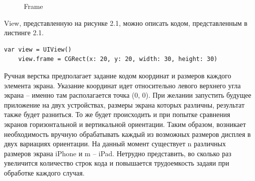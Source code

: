\begin{figure}[h!]
	\caption{Frame}
	\label{fig:frame}
\end{figure}

View, представленную на рисунке 2.1, можно описать кодом, представленным в листинге 2.1. 

\begin{lstlisting}[caption=Задание свойства frame для UIView]
	var view = UIView()
	view.frame = CGRect(x: 20, y: 20, width: 30, height: 30)
\end{lstlisting}

Ручная верстка предполагает задание кодом координат и размеров каждого элемента экрана. Указание координат идет относительно левого верхнего угла экрана -- именно там располагается точка (0, 0). При желании запустить будущее приложение на двух устройствах, размеры экрана которых различны, результат также будет разниться. То же будет происходить и при попытке сравнения экранов горизонтальной и вертикальной ориентации. Таким образом, возникает необходимость вручную обрабатывать каждый из возможных размеров дисплея в двух вариациях ориентации. На данный момент существует n различных размеров экрана iPhone и m -- iPad. Нетрудно представить, во сколько раз увеличится количество строк кода и повышается трудоемкость задаяи при обработке каждого случая. 

